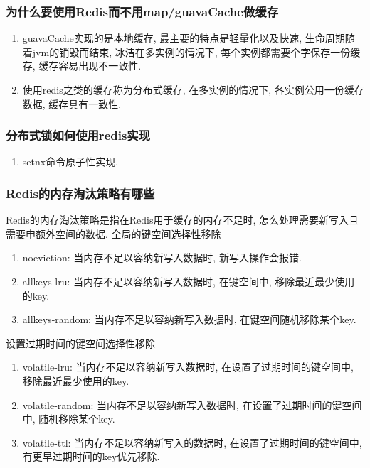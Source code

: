\documentclass[UTF8]{ctexart}
\begin{document}
	\subsubsection{为什么要使用Redis而不用map/guavaCache做缓存}
	\begin{enumerate}
		\item guavaCache实现的是本地缓存, 最主要的特点是轻量化以及快速, 生命周期随着jvm的销毁而结束, 冰洁在多实例的情况下, 每个实例都需要个字保存一份缓存, 缓存容易出现不一致性.
		\item 使用redis之类的缓存称为分布式缓存, 在多实例的情况下, 各实例公用一份缓存数据, 缓存具有一致性.
	\end{enumerate}
	\subsubsection{分布式锁如何使用redis实现}
	\begin{enumerate}
		\item setnx命令原子性实现. 
	\end{enumerate}
	\subsubsection{Redis的内存淘汰策略有哪些}
	Redis的内存淘汰策略是指在Redis用于缓存的内存不足时, 怎么处理需要新写入且需要申额外空间的数据.
	全局的键空间选择性移除
	\begin{enumerate}
		
		\item noeviction: 当内存不足以容纳新写入数据时, 新写入操作会报错.
		\item allkeys-lru: 当内存不足以容纳新写入数据时, 在键空间中, 移除最近最少使用的key.
		\item allkeys-random: 当内存不足以容纳新写入数据时, 在键空间随机移除某个key.
	\end{enumerate}
	设置过期时间的键空间选择性移除
	\begin{enumerate}
		
		\item volatile-lru: 当内存不足以容纳新写入数据时, 在设置了过期时间的键空间中, 移除最近最少使用的key.
		\item volatile-random: 当内存不足以容纳新写入数据时, 在设置了过期时间的键空间中, 随机移除某个key.
		\item volatile-ttl: 当内存不足以容纳新写入的数据时, 在设置了过期时间的键空间中, 有更早过期时间的key优先移除. 
	\end{enumerate}
\end{document}
